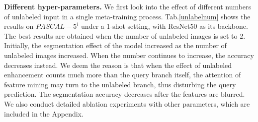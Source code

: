 \documentclass[letterpaper]{article} %
\begin{document}
\begin{table}[!t]
\centering
\begin{threeparttable}
\end{threeparttable}
\caption{Ablation studies of different numbers of unlabeled images in the single meta-training process.}
\label{unlabelnum}
\end{table}

\textbf{Different hyper-parameters.} We first look into the effect of different numbers of unlabeled input in a single meta-training process. Tab.\ref{unlabelnum} shows the results on $PASCAL-5^i$ under a 1-shot setting, with ResNet50 as its backbone. The best results are obtained when the number of unlabeled images is set to 2. Initially, the segmentation effect of the model increased as the number of unlabeled images increased. When the number continues to increase, the accuracy decreases instead. We deem the reason is that when the effect of unlabeled enhancement counts much more than the query branch itself, the attention of feature mining may turn to the unlabeled branch, thus disturbing the query prediction. The segmentation accuracy decreases after the features are blurred. We also conduct detailed ablation experiments with other parameters, which are included in the Appendix.


\vspace{-2.93mm}
\end{document}
